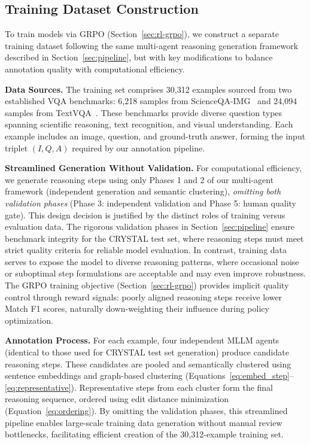 
\subsection{Training Dataset Construction}
\label{sec:training_data}

To train models via GRPO (Section~\ref{sec:rl-grpo}), we construct a separate training dataset following the same multi-agent reasoning generation framework described in Section~\ref{sec:pipeline}, but with key modifications to balance annotation quality with computational efficiency.

\textbf{Data Sources.}
The training set comprises 30,312 examples sourced from two established VQA benchmarks: 6,218 samples from ScienceQA-IMG~\cite{scienceqa} and 24,094 samples from TextVQA~\cite{textvqa}. These benchmarks provide diverse question types spanning scientific reasoning, text recognition, and visual understanding. Each example includes an image, question, and ground-truth answer, forming the input triplet $(I, Q, A)$ required by our annotation pipeline.

\textbf{Streamlined Generation Without Validation.}
For computational efficiency, we generate reasoning steps using only Phases 1 and 2 of our multi-agent framework (independent generation and semantic clustering), \textit{omitting both validation phases} (Phase 3: independent validation and Phase 5: human quality gate). This design decision is justified by the distinct roles of training versus evaluation data. The rigorous validation phases in Section~\ref{sec:pipeline} ensure benchmark integrity for the CRYSTAL test set, where reasoning steps must meet strict quality criteria for reliable model evaluation. In contrast, training data serves to expose the model to diverse reasoning patterns, where occasional noise or suboptimal step formulations are acceptable and may even improve robustness. The GRPO training objective (Section~\ref{sec:rl-grpo}) provides implicit quality control through reward signals: poorly aligned reasoning steps receive lower Match F1 scores, naturally down-weighting their influence during policy optimization.

\textbf{Annotation Process.}
For each example, four independent MLLM agents (identical to those used for CRYSTAL test set generation) produce candidate reasoning steps. These candidates are pooled and semantically clustered using sentence embeddings and graph-based clustering (Equations~\ref{eq:embed_step}--\ref{eq:representative}). Representative steps from each cluster form the final reasoning sequence, ordered using edit distance minimization (Equation~\ref{eq:ordering}). By omitting the validation phases, this streamlined pipeline enables large-scale training data generation without manual review bottlenecks, facilitating efficient creation of the 30,312-example training set.
